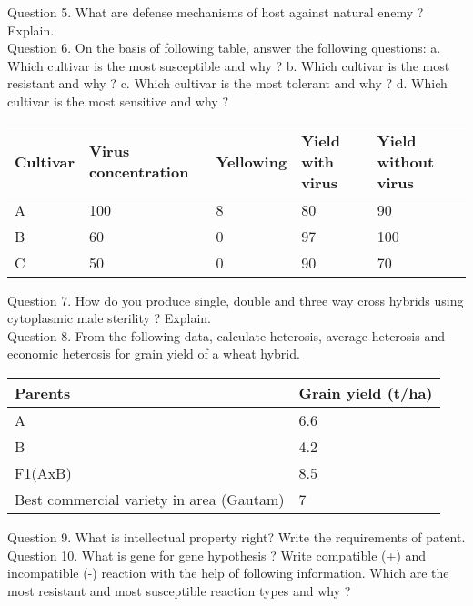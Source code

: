 \documentclass[12pt]{article}\usepackage[]{graphicx}\usepackage[]{color}
\begin{document}
Question 5. What are defense mechanisms of host against natural enemy ? Explain.\\
Question 6. On the basis of following table, answer the following questions: a. Which cultivar is the most susceptible and why ? b. Which cultivar is the most resistant and why ? c. Which cultivar is the most tolerant and why ? d. Which cultivar is the most sensitive and why ?\\ 
\begin{table}[H]
\centering\begingroup\fontsize{8}{10}\selectfont

\begin{tabular}[t]{lllll}
\toprule
Cultivar & Virus concentration & Yellowing & Yield with virus & Yield without virus\\
\midrule
A & 100 & 8 & 80 & 90\\
B & 60 & 0 & 97 & 100\\
C & 50 & 0 & 90 & 70\\
\bottomrule
\end{tabular}
\endgroup{}
\end{table}
Question 7. How do you produce single, double and three way cross hybrids using cytoplasmic male sterility ? Explain.\\
Question 8. From the following data, calculate heterosis, average heterosis and economic heterosis for grain yield of a wheat hybrid.\\ 
\begin{table}[H]
\centering\begingroup\fontsize{8}{10}\selectfont

\begin{tabular}[t]{ll}
\toprule
Parents & Grain yield (t/ha)\\
\midrule
A & 6.6\\
B & 4.2\\
F1(AxB) & 8.5\\
Best commercial variety in area (Gautam) & 7\\
\bottomrule
\end{tabular}
\endgroup{}
\end{table}
Question 9. What is intellectual property right? Write the requirements of patent.\\
Question 10. What is gene for gene hypothesis ? Write compatible (+) and incompatible (-) reaction with the help of following information. Which are the most resistant and most susceptible reaction types and why ?\\ 
\end{document}
